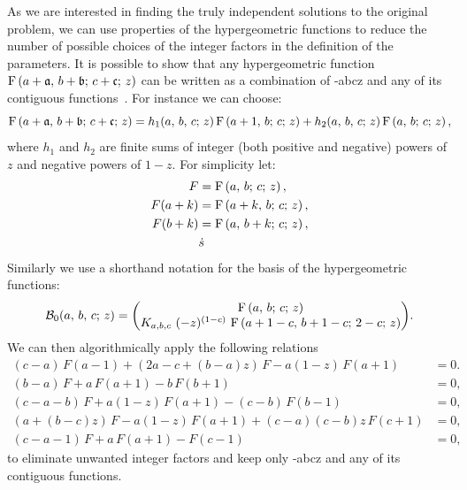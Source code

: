 As we are interested in finding the truly independent solutions to the original problem, we can use properties of the hypergeometric functions to reduce the number of possible choices of the integer factors in the definition of the parameters.
It is possible to show that any hypergeometric function $\mathrm{F}\left( a + \mathfrak{a},\, b + \mathfrak{b};\, c + \mathfrak{c};\, z \right)$ can be written as a combination of \hyp{a}{b}{c}{z} and any of its contiguous functions~\cite{Olver:2020:NISTDigitalLibrary}.
For instance we can choose:
\begin{equation}
  \mathrm{F}\left( a + \mathfrak{a},\, b + \mathfrak{b};\, c + \mathfrak{c};\, z \right)
  =
  h_1(a,\, b,\, c;\, z)\,
  \mathrm{F}\left( a+1,\, b;\, c;\, z \right)
  +
  h_2(a,\, b,\, c;\, z)\,
  \mathrm{F}\left( a,\, b;\, c;\, z \right),
  \label{eq:reduction_F_F+}
\end{equation}
where $h_1$ and $h_2$ are finite sums of integer (both positive and negative) powers of $z$ and negative powers of $1-z$.
For simplicity let:
\begin{equation}
  \begin{split}
    F & = \mathrm{F}\left( a,\, b;\, c;\, z \right),
    \\
    F(a+k) & = \mathrm{F}\left( a+k,\, b;\, c;\, z \right),
    \\
    F(b+k) & = \mathrm{F}\left( a,\, b+k;\, c;\, z \right),
    \\
    & \dot{s}
  \end{split}
\end{equation}
Similarly we use a shorthand notation for the basis of the hypergeometric functions:\footnotemark{}
\begin{equation}
  \cB_{0}(a,\, b,\, c;\, z)
  =
  \mqty(
    \hyp{a}{b}{c}{z}
    \\
    K_{a,b,c}~
    (-z)^{(1-c)}~
    \hyp{a+1-c}{b+1-c}{2-c}{z}
  ).
\end{equation}
We can then algorithmically apply the following relations
\begin{equation}
  \begin{split}
    (c-a)\, F(a-1) + (2a-c+(b-a)z)\, F - a(1-z)\, F(a+1) & = 0.
    \\
    (b-a)\, F + a\, F(a+1) - b\, F(b+1) & = 0,
    \\
    (c-a-b)\, F + a (1-z)\, F(a+1) - (c-b)\, F(b-1) & = 0,
    \\
    (a+(b-c)z)\, F - a (1-z)\, F(a+1) + (c-a)(c-b)z\, F(c+1) & = 0,
    \\
    (c-a-1)\, F + a\, F(a+1) - F(c-1) & = 0,
  \end{split}
  \label{eq:contiguous_functions}
\end{equation}
to eliminate unwanted integer factors and keep only \hyp{a}{b}{c}{z} and any of its contiguous functions.

